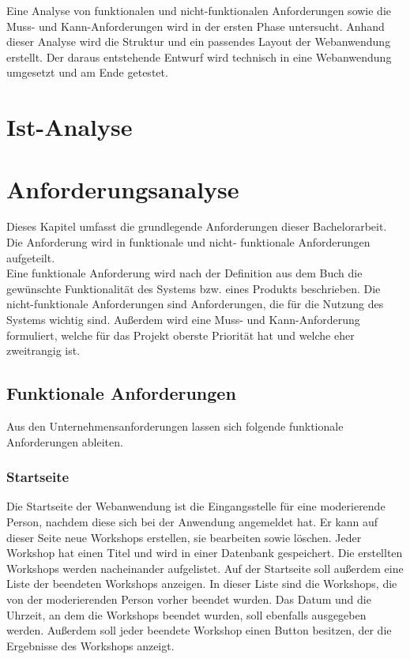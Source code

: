 \newpage
Eine Analyse von funktionalen und nicht-funktionalen Anforderungen sowie die Muss- und Kann-Anforderungen wird in der ersten Phase untersucht. Anhand dieser Analyse wird die Struktur und ein passendes Layout der Webanwendung erstellt. Der daraus entstehende Entwurf wird technisch in eine Webanwendung umgesetzt und am Ende getestet.

\section{Ist-Analyse}
\label{sec:ist-analyse}



\section{Anforderungsanalyse}
\label{sec:anforderungsanalyse}
Dieses Kapitel umfasst die grundlegende Anforderungen dieser Bachelorarbeit. Die Anforderung wird in funktionale und nicht- funktionale Anforderungen aufgeteilt. 
\\

Eine funktionale Anforderung wird nach der Definition aus dem Buch \cite{Balzert2010} die gewünschte Funktionalität des Systems bzw. eines Produkts beschrieben. 
Die nicht-funktionale Anforderungen sind Anforderungen, die für die Nutzung des Systems wichtig sind. Außerdem wird eine Muss- und Kann-Anforderung formuliert, welche für das Projekt oberste Priorität hat und welche eher zweitrangig ist.

\subsection{Funktionale Anforderungen}
\label{sec:funktionale anforderungen}
\label{sec:funktionale anforderungen}
Aus den Unternehmensanforderungen lassen sich folgende funktionale Anforderungen ableiten.

\subsubsection*{Startseite}
Die Startseite der Webanwendung ist die Eingangsstelle für eine moderierende Person, nachdem diese sich bei der Anwendung angemeldet hat. Er kann auf dieser Seite neue Workshops erstellen, sie bearbeiten sowie löschen. Jeder Workshop hat einen Titel und wird in einer Datenbank gespeichert. Die erstellten Workshops werden nacheinander aufgelistet. Auf der Startseite soll außerdem eine Liste der beendeten Workshops anzeigen. In dieser Liste sind die Workshops, die von der moderierenden Person vorher beendet wurden. Das Datum und die Uhrzeit, an dem die Workshops beendet wurden, soll ebenfalls ausgegeben werden. Außerdem soll jeder beendete Workshop einen Button besitzen, der die Ergebnisse des Workshops anzeigt. 

